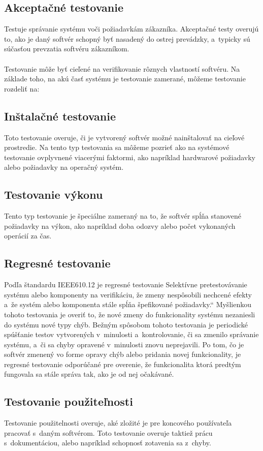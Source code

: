 \subsection*{Akceptačné testovanie}
Testuje správanie systému voči požiadavkám zákazníka. Akceptačné testy overujú to, ako je daný softvér 
schopný byť nasadený do ostrej prevádzky, a~typicky sú súčasťou prevzatia softvéru zákazníkom.
\\
\\
Testovanie môže byť cieľené na verifikovanie rôznych vlastností softvéru. Na základe toho, na akú časť systému je 
testovanie zamerané, môžeme testovanie rozdeliť na:
\subsection*{Inštalačné testovanie}
Toto testovanie overuje, či je vytvorený softvér možné nainštalovať
na cieľové prostredie. Na tento typ testovania sa môžeme pozrieť ako na 
systémové testovanie ovplyvnené viacerými faktormi, ako napríklad hardwarové požiadavky
alebo požiadavky na operačný systém. 
\subsection*{Testovanie výkonu}
Tento typ testovanie je špeciálne zameraný na to, že softvér spĺňa stanovené požiadavky 
na výkon, ako napríklad doba odozvy alebo počet vykonaných operácií za čas. 
\subsection*{Regresné testovanie} \label{sekcia:regresne_testovanie}
Podľa štandardu IEEE610.12 \cite{Ieee_glossary} je regresné testovanie \quotedblbase Selektívne pretestovávanie 
systému alebo komponenty na verifikáciu, že zmeny nespôsobili nechcené efekty a~že systém alebo
komponenta stále spĺňa špefikované požiadavky.\textquotedblleft
Myšlienkou tohoto testovania je overiť to, že nové zmeny do funkcionality systému nezaniesli do systému nové typy chýb.
Bežným spôsobom tohoto testovania je periodické spúšťanie testov vytvorených v~minulosti a~kontrolovanie, či sa zmenilo správanie
systému, a~či sa chyby opravené v~minulosti znovu neprejavili. Po tom, čo je softvér zmenený vo forme opravy chýb alebo
pridania novej funkcionality, je regresné testovanie odporúčané pre overenie, že funkcionalita ktorá predtým fungovala sa stále správa tak, 
ako je od nej očakávané.
\subsection*{Testovanie použiteľnosti}
Testovanie použitelnosti overuje, aké zložité je pre koncového používateľa pracovať s~daným softvérom.
Toto testovanie overuje taktiež prácu s~dokumentáciou, alebo napríklad schopnosť zotavenia sa z~chyby. 
\\

